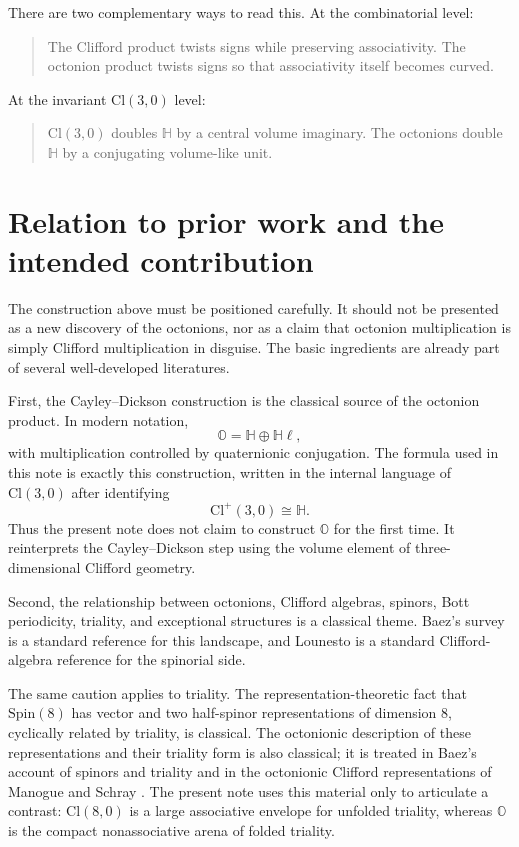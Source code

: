\documentclass[11pt]{article}
\newcommand{\Cl}{\mathrm{Cl}}
\begin{document}
There are two complementary ways to read this. At the combinatorial level:

\begin{quote}
The Clifford product twists signs while preserving associativity.
The octonion product twists signs so that associativity itself becomes curved.
\end{quote}

At the invariant $\Cl(3,0)$ level:

\begin{quote}
$\Cl(3,0)$ doubles $\mathbb H$ by a central volume imaginary.
The octonions double $\mathbb H$ by a conjugating volume-like unit.
\end{quote}



\section{Relation to prior work and the intended contribution}

The construction above must be positioned carefully. It should not be presented
as a new discovery of the octonions, nor as a claim that octonion multiplication
is simply Clifford multiplication in disguise. The basic ingredients are already
part of several well-developed literatures.

First, the Cayley--Dickson construction is the classical source of the
 octonion product. In modern notation,
\[
\mathbb O=\mathbb H\oplus \mathbb H\ell,
\]
with multiplication controlled by quaternionic conjugation. The formula used in
this note is exactly this construction, written in the internal language of
$\Cl(3,0)$ after identifying
\[
\Cl^+(3,0)\cong \mathbb H.
\]
Thus the present note does not claim to construct $\mathbb O$ for the first
time. It reinterprets the Cayley--Dickson step using the volume element of
three-dimensional Clifford geometry.

Second, the relationship between octonions, Clifford algebras, spinors, Bott
periodicity, triality, and exceptional structures is a classical theme. Baez's
survey \cite{BaezOctonions} is a standard reference for this landscape, and
Lounesto \cite{Lounesto} is a standard Clifford-algebra reference for the
spinorial side.

The same caution applies to triality. The representation-theoretic fact that
$\mathrm{Spin}(8)$ has vector and two half-spinor representations of dimension
$8$, cyclically related by triality, is classical. The octonionic description of
these representations and their triality form is also classical; it is treated
in Baez's account of spinors and triality and in the octonionic Clifford
representations of Manogue and Schray \cite{BaezOctonions,ManogueSchray}. The
present note uses this material only to articulate a contrast: $\Cl(8,0)$ is a
large associative envelope for unfolded triality, whereas $\mathbb O$ is the
compact nonassociative arena of folded triality.
\end{document}
